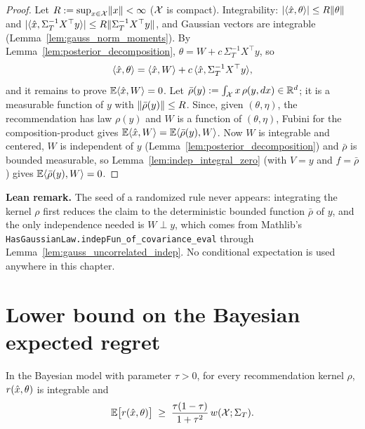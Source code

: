 \begin{proof}
\leanok
{}
Let $R := \sup_{x\in\mathcal{X}}\lVert x \rVert < \infty$ ($\mathcal{X}$ is compact). Integrability:
$\lvert \langle \hat{x}, \theta \rangle \rvert \le R\lVert \theta \rVert$ and
$\lvert \langle \hat{x}, \Sigma_T^{-1}X^\top y \rangle \rvert \le R\lVert \Sigma_T^{-1}X^\top y \rVert$, and Gaussian
vectors are integrable (Lemma~\ref{lem:gauss_norm_moments}). By
Lemma~\ref{lem:posterior_decomposition}, $\theta = W + c\,\Sigma_T^{-1}X^\top y$, so
\[
  \langle \hat{x}, \theta \rangle = \langle \hat{x}, W \rangle + c\,\langle \hat{x}, \Sigma_T^{-1}X^\top y \rangle,
\]
and it remains to prove $\mathbb{E}\langle \hat{x}, W \rangle = 0$. Let
$\bar\rho(y) := \int_{\mathcal{X}} x\,\rho(y, dx) \in \mathbb{R}^d$; it is a measurable function of $y$ with
$\lVert \bar\rho(y) \rVert \le R$. Since, given $(\theta, \eta)$, the recommendation has law
$\rho(y)$ and $W$ is a function of $(\theta,\eta)$, Fubini for the composition-product gives
$\mathbb{E}\langle \hat{x}, W \rangle = \mathbb{E}\langle \bar\rho(y), W \rangle$. Now $W$ is integrable and centered, $W$ is
independent of $y$ (Lemma~\ref{lem:posterior_decomposition}) and $\bar\rho$ is bounded
measurable, so Lemma~\ref{lem:indep_integral_zero} (with $V = y$ and $f = \bar\rho$) gives
$\mathbb{E}\langle \bar\rho(y), W \rangle = 0$.
\end{proof}

\textbf{Lean remark.} The seed of a randomized rule never appears: integrating the kernel
$\rho$ first reduces the claim to the deterministic bounded function $\bar\rho$ of $y$, and
the only independence needed is $W \perp y$, which comes from Mathlib's
\texttt{HasGaussianLaw.indepFun\_of\_covariance\_eval} through
Lemma~\ref{lem:gauss_uncorrelated_indep}. No conditional expectation is used anywhere in
this chapter.

\section{Lower bound on the Bayesian expected regret}
\label{sec:lower_nonadaptive_regret}

\begin{lemma}\label{lem:bayes_regret_lower}
\leanok
{}
In the Bayesian model with parameter $\tau > 0$, for every recommendation kernel $\rho$,
$r(\hat{x},\theta)$ is integrable and
\[
  \mathbb{E}\big[ r(\hat{x}, \theta) \big] \;\ge\; \frac{\tau(1-\tau)}{1+\tau^2}\,w(\mathcal{X};\Sigma_T) .
\]
\end{lemma}

